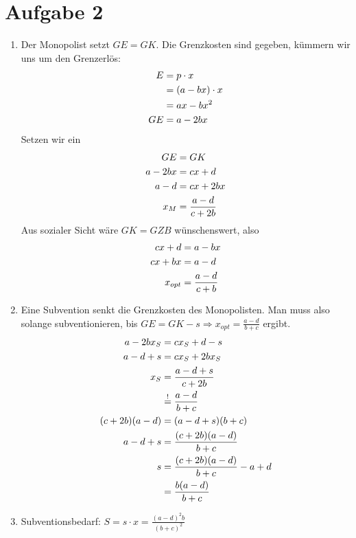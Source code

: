 \documentclass{article}
\begin{document}
	\section*{Aufgabe 2}
	\begin{enumerate}[label=(\alph*)]
		\item Der Monopolist setzt $GE=GK$. Die Grenzkosten sind gegeben, kümmern wir uns um den Grenzerlös:
		\begin{align}
			E &= p\cdot x \notag \\
			&= (a-bx)\cdot x \notag \\
			&= ax - bx^2 \notag \\
			GE &= a - 2bx \notag
		\end{align}
		Setzen wir ein
		\begin{align}
			GE &= GK \notag \\
			a-2bx &= cx+d \notag \\
			a-d &= cx+2bx \notag \\
			x_M &= \frac{a-d}{c+2b} \notag
		\end{align}
		Aus sozialer Sicht wäre $GK=GZB$ wünschenswert, also
		\begin{align}
			cx+d &= a-bx \notag \\
			cx+bx &= a-d \notag \\
			x_{opt} &= \frac{a-d}{c+b} \notag
		\end{align}
		\item Eine Subvention senkt die Grenzkosten des Monopolisten. Man muss also solange subventionieren, bis $GE=GK-s \Rightarrow x_{opt}=\frac{a-d}{b+c}$ ergibt.
		\begin{align}
			a-2bx_S &= cx_S+d-s \notag \\
			a-d+s &= cx_S + 2bx_S \notag \\
			x_S &= \frac{a-d+s}{c+2b} \notag \\
			&\overset{!}{=} \frac{a-d}{b+c} \notag \\
			(c+2b)(a-d) &= (a-d+s)(b+c) \notag \\
			a-d+s &= \frac{(c+2b)(a-d)}{b+c} \notag \\
			s &= \frac{(c+2b)(a-d)}{b+c}-a+d \notag \\
			&= \frac{b(a-d)}{b+c} \notag
		\end{align}
		\item Subventionsbedarf: $S = s\cdot x = \frac{(a-d)^2b}{(b+c)^2}$
		\begin{center}
\end{center}
\end{enumerate}
\end{document}

